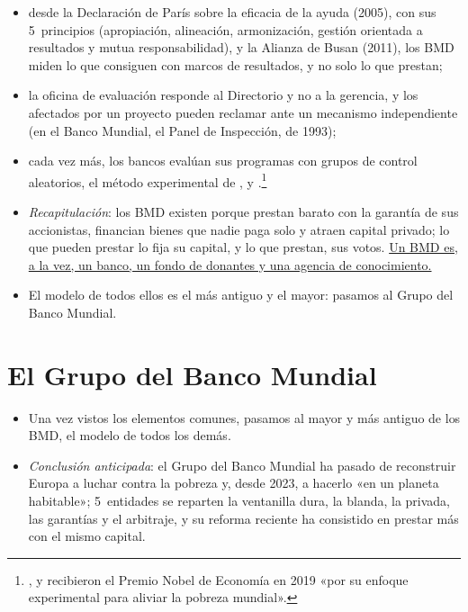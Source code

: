 \documentclass[11pt]{article}
\begin{document}
\begin{itemize}
\begin{itemize}
  \item desde la Declaración de París sobre la eficacia de la ayuda (2005), con sus 5~principios (apropiación, alineación, armonización, gestión orientada a resultados y mutua responsabilidad), y la Alianza de Busan (2011), los BMD miden lo que consiguen con marcos de resultados, y no solo lo que prestan\nocite{OCDE2005Paris};
  \item la oficina de evaluación responde al Directorio y no a la gerencia, y los afectados por un proyecto pueden reclamar ante un mecanismo independiente (en el Banco Mundial, el Panel de Inspección, de 1993);
  \item cada vez más, los bancos evalúan sus programas con grupos de control aleatorios, el método experimental de ,  y  .\footnote{,  y  recibieron el Premio Nobel de Economía en 2019 «por su enfoque experimental para aliviar la pobreza mundial»\nocite{Nobel2019BanerjeeDufloKremer}.}
  \end{itemize}
\end{itemize}

\begin{itemize}
\item \emph{Recapitulación}: los BMD existen porque prestan barato con la garantía de sus accionistas, financian bienes que nadie paga solo y atraen capital privado; lo que pueden prestar lo fija su capital, y lo que prestan, sus votos. \uline{Un BMD es, a la vez, un banco, un fondo de donantes y una agencia de conocimiento.}
\item El modelo de todos ellos es el más antiguo y el mayor: pasamos al Grupo del Banco Mundial.
\end{itemize}

\section{El Grupo del Banco Mundial}\label{sec:gbm}

\begin{itemize}
\item Una vez vistos los elementos comunes, pasamos al mayor y más antiguo de los BMD, el modelo de todos los demás.
\item \emph{Conclusión anticipada}: el Grupo del Banco Mundial ha pasado de reconstruir Europa a luchar contra la pobreza y, desde 2023, a hacerlo «en un planeta habitable»; 5~entidades se reparten la ventanilla dura, la blanda, la privada, las garantías y el arbitraje, y su reforma reciente ha consistido en prestar más con el mismo capital.
\end{itemize}
\end{document}
